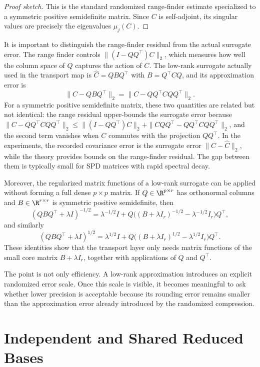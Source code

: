 \begin{proof}[Proof sketch]
	This is the standard randomized range-finder estimate specialized to a symmetric
	positive semidefinite matrix. Since \(C\) is self-adjoint, its singular values are
	precisely the eigenvalues \(\mu_j(C)\).
\end{proof}

It is important to distinguish the range-finder residual from the actual
surrogate error. The range finder controls
\(\|(I-QQ^\top)C\|_2\), which measures how well the column space of \(Q\)
captures the action of \(C\). The low-rank surrogate actually used in the
transport map is \(\widehat C = QBQ^\top\) with \(B = Q^\top C Q\), and its
approximation error is
\[
	\|C - QBQ^\top\|_2
	=
	\|C - QQ^\top C QQ^\top\|_2.
\]
For a symmetric positive semidefinite matrix, these two quantities are related
but not identical: the range residual upper-bounds the surrogate error because
\(\|C - QQ^\top C QQ^\top\|_2 \le \|(I-QQ^\top)C\|_2 + \|CQQ^\top - QQ^\top C QQ^\top\|_2\),
and the second term vanishes when \(C\) commutes with the projection \(QQ^\top\).
In the experiments, the recorded covariance error is the surrogate error
\(\|C - \widehat C\|_2\), while the theory provides bounds on the range-finder
residual. The gap between them is typically small for SPD matrices with rapid
spectral decay.

Moreover, the regularized matrix functions of a low-rank surrogate can be applied
without forming a full dense \(p \times p\) matrix. If \(Q \in \R^{p \times r}\) has
orthonormal columns and \(B \in \R^{r \times r}\) is symmetric positive
semidefinite, then
\[
	(QBQ^\top + \lambda I)^{-1/2}
	=
	\lambda^{-1/2} I
	+
	Q\bigl((B+\lambda I_r)^{-1/2} - \lambda^{-1/2} I_r\bigr)Q^\top,
\]
and similarly
\[
	(QBQ^\top + \lambda I)^{1/2}
	=
	\lambda^{1/2} I
	+
	Q\bigl((B+\lambda I_r)^{1/2} - \lambda^{1/2} I_r\bigr)Q^\top.
\]
These identities show that the transport layer only needs matrix functions of the
small core matrix \(B + \lambda I_r\), together with applications of \(Q\) and
\(Q^\top\).

The point is not only efficiency. A low-rank approximation introduces an explicit randomized error scale. Once this scale is visible, it becomes meaningful to ask whether lower precision is acceptable because its rounding error remains smaller than the approximation error already introduced by the randomized compression.

\section{Independent and Shared Reduced Bases}

